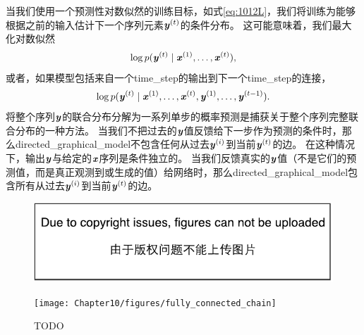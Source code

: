 当我们使用一个预测性对数似然的训练目标，如式\eqref{eq:1012L}，我们将训练为能够根据之前的输入估计下一个序列元素$\boldsymbol{\mathit{y}}^{(t)}$的条件分布。
这可能意味着，我们最大化对数似然
\begin{align}
 \log p(\boldsymbol{\mathit{y}}^{(t)} \mid \boldsymbol{\mathit{x}}^{(1)},\dots, \boldsymbol{\mathit{x}}^{(t)}),
\end{align}
或者，如果模型包括来自一个\gls{time_step}的输出到下一个\gls{time_step}的连接，
\begin{align}
 \log p(\boldsymbol{\mathit{y}}^{(t)} \mid \boldsymbol{\mathit{x}}^{(1)},\dots, \boldsymbol{\mathit{x}}^{(t)},\boldsymbol{\mathit{y}}^{(1)},\dots, \boldsymbol{\mathit{y}}^{(t-1)} ).
\end{align}
将整个序列$\boldsymbol{\mathit{y}}$的联合分布分解为一系列单步的概率预测是捕获关于整个序列完整联合分布的一种方法。
当我们不把过去的$\boldsymbol{\mathit{y}}$值反馈给下一步作为预测的条件时，那么\gls{directed_graphical_model}不包含任何从过去$\boldsymbol{\mathit{y}}^{(i)}$到当前$\boldsymbol{\mathit{y}}^{(t)}$的边。
在这种情况下，输出$\boldsymbol{\mathit{y}}$与给定的$\boldsymbol{\mathit{x}}$序列是条件独立的。
当我们反馈真实的$\boldsymbol{\mathit{y}}$值（不是它们的预测值，而是真正观测到或生成的值）给网络时，那么\gls{directed_graphical_model}包含所有从过去$\boldsymbol{\mathit{y}}^{(i)}$到当前$\boldsymbol{\mathit{y}}^{(t)}$的边。
\begin{figure}[!htb]
\ifOpenSource
\centerline{\includegraphics{figure.pdf}}
\else
\centerline{\texttt{[image: Chapter10/figures/fully\_connected\_chain]}}
\fi
\caption{TODO}
\label{fig:chap10_fully_connected_chain}
\end{figure}



